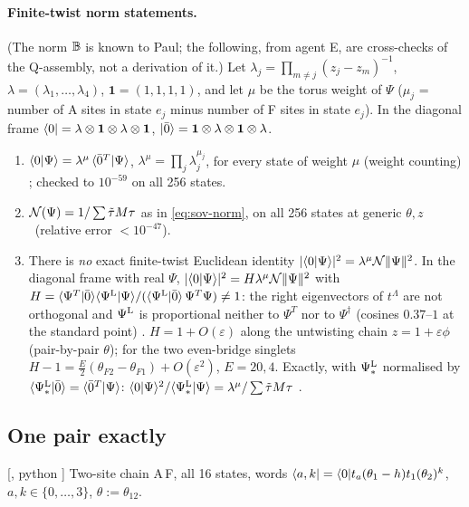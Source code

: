 \paragraph{Finite-twist norm statements.} (The norm $\mathbb B$ is known to Paul; the following, from agent E, are cross-checks of the Q-assembly, not a derivation of it.) Let
$\lambda_j=\prod_{m\ne j}(z_j-z_m)^{-1}$, $\lambda=(\lambda_1,\dots,\lambda_4)$, $\mathbf1=(1,1,1,1)$, and let $\mu$ be the torus weight of $\Psi$ ($\mu_j$ = number of A sites in state $e_j$ minus number of
F sites in state $e_j$). In the diagonal frame $\langle0|=\lambda\otimes\mathbf1\otimes\lambda\otimes\mathbf1$, $|\bar0\rangle=\mathbf1\otimes\lambda\otimes\mathbf1\otimes\lambda$.
\begin{enumerate}
\item[(E1)] $\langle0|\Psi\rangle=\lambda^{\mu}\,\langle\bar0^T|\Psi\rangle$, $\lambda^\mu=\prod_j\lambda_j^{\mu_j}$, for every state of weight $\mu$ (weight counting) \ex; checked to $10^{-59}$ on all 256 states.
\item[(E2)] $\mathcal N(\Psi)=1/\sum\tilde\tau M\tau$ as in \eqref{eq:sov-norm}, on all 256 states at generic $\theta,z$ \hp\ (relative error $<10^{-47}$).
\item[(E3)] There is \emph{no} exact finite-twist Euclidean identity $|\langle0|\Psi\rangle|^2=\lambda^\mu\mathcal N\|\Psi\|^2$. In the diagonal frame with real $\Psi$,
 $|\langle0|\Psi\rangle|^2=H\lambda^{\mu}\mathcal N\|\Psi\|^2$ with $H=\langle\Psi^T|\bar0\rangle\langle\Psi^{\mathrm L}|\Psi\rangle/(\langle\Psi^{\mathrm L}|\bar0\rangle\,\Psi^T\Psi)\ne1$: the right eigenvectors of $t^\Lambda$ are not orthogonal and
 $\Psi^{\mathrm L}$ is proportional neither to $\Psi^T$ nor to $\Psi^\dagger$ (cosines $0.37$--$1$ at the standard point) \hp.
 $H=1+O(\varepsilon)$ along the untwisting chain $z=1+\varepsilon\phi$ (pair-by-pair $\theta$); for the two even-bridge singlets $H-1=\tfrac E2(\theta_{F2}-\theta_{F1})+O(\varepsilon^2)$, $E=20,4$.
 Exactly, with $\Psi^{\mathrm L}_*$ normalised by $\langle\Psi^{\mathrm L}_*|\bar0\rangle=\langle\bar0^T|\Psi\rangle$: $\langle0|\Psi\rangle^2/\langle\Psi^{\mathrm L}_*|\Psi\rangle=\lambda^\mu/\sum\tilde\tau M\tau$ \hp.
\end{enumerate}

\subsection{One pair exactly}\label{sec:sov-onepair}

[, python ] Two-site chain A\,F, all 16 states, words $\langle a,k|=\langle0|t_a(\theta_1-h)t_1(\theta_2)^k$,
$a,k\in\{0,\dots,3\}$, $\theta:=\theta_{12}$.

